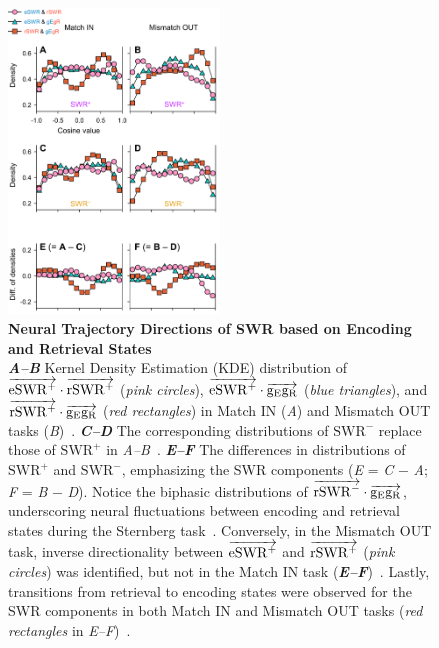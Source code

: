 \documentclass[final,3p,times,twocolumn]{elsarticle}
\begin{document}
        \clearpage
        \begin{figure}[ht]
        	\centering
            \includegraphics[width=0.5\textwidth]{./src/figures/.png/Figure_ID_07.png}
        	\caption{\textbf{
Neural Trajectory Directions of SWR based on Encoding and Retrieval States
}
\smallskip
\\
\textbf{\textit{A--B}} Kernel Density Estimation (KDE) distribution of $\protect\overrightarrow{{\mathrm{eSWR^+}}} \cdot \protect\overrightarrow{{\mathrm{rSWR^+}}}$ (\textit{pink circles}), $\protect\overrightarrow{{\mathrm{eSWR^+}}} \cdot \protect\overrightarrow{{\mathrm{g_{E}g_{R}}}}$ (\textit{blue triangles}), and $\protect\overrightarrow{{\mathrm{rSWR^+}}} \cdot \protect\overrightarrow{{\mathrm{g_{E}g_{R}}}}$ (\textit{red rectangles}) in Match IN (\textit{A}) and Mismatch OUT tasks (\textit{B})~\cite{li_functional_2023}. \textbf{\textit{C--D}} The corresponding distributions of $\mathrm{SWR^-}$ replace those of $\mathrm{SWR^+}$ in \textit{A--B}~\cite{dimakopoulos_information_2022}. \textbf{\textit{E--F}} The differences in distributions of $\mathrm{SWR^+}$ and $\mathrm{SWR^-}$, emphasizing the SWR components (\textit{E} = \textit{C} $-$ \textit{A}; \textit{F} = \textit{B} $-$ \textit{D}). Notice the biphasic distributions of $\protect\overrightarrow{{\mathrm{rSWR^-}}} \cdot \protect\overrightarrow{{\mathrm{g_{E}g_{R}}}}$, underscoring neural fluctuations between encoding and retrieval states during the Sternberg task~\cite{borders_hippocampus_2022}. Conversely, in the Mismatch OUT task, inverse directionality between $\protect\overrightarrow{{\mathrm{eSWR^+}}}$ and $\protect\overrightarrow{{\mathrm{rSWR^+}}}$ (\textit{pink circles}) was identified, but not in the Match IN task (\textbf{\textit{E--F}})~\cite{naber_reciprocal_2001,van_strien_anatomy_2009}. Lastly, transitions from retrieval to encoding states were observed for the SWR components in both Match IN and Mismatch OUT tasks (\textit{red rectangles} in \textit{E--F})~\cite{niediek_reliable_2016,schomburg_spiking_2012}.
}
        	\label{fig:07}
        \end{figure}


\end{document}

